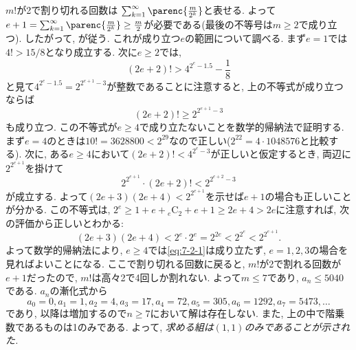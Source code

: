 $m!$が2で割り切れる回数は $\sum_{k=1}^{\infty} \parenc{\frac{m}{2^k}}$と表せる. よって$e + 1 = \sum_{k=1}^{\infty} \parenc{\frac{m}{2^k}} \geq \frac{m}{2}$が必要である(最後の不等号は$m\geq 2$で成り立つ). したがって,
が従う. これが成り立つ$e$の範囲について調べる. まず$e=1$では$4! > 15/8$となり成立する. 次に$e\geq 2$では,
\[
(2e+2)! > 4^{2^e - 1.5} - \frac{1}{8}
\]
と見て$4^{2^e - 1.5} = 2^{2^{e+1} - 3}$が整数であることに注意すると, 上の不等式が成り立つならば
\begin{equation} \label{eq:7-2-1}
    (2e+2)! \geq 2^{2^{e+1} - 3}
\end{equation}
も成り立つ. この不等式が$e\geq 4$で成り立たないことを数学的帰納法で証明する. まず$e=4$のときは$10! = 3628800 < 2^{29}$なので正しい($2^{22} = 4\cdot 1048576$と比較する). 次に, ある$e\geq 4$において$(2e + 2)! < 4^{2^e - 3}$が正しいと仮定するとき, 両辺に$2^{2^{e+1}}$を掛けて
\[
2^{2^{e+1}}\cdot (2e + 2)! < 2^{2^{e+2} - 3}
\]
が成立する. よって$(2e + 3)(2e + 4) < 2^{2^{e+1}}$を示せば$e+1$の場合も正しいことが分かる. この不等式は, $2^e \geq 1 + e + {}_{e}{\mathrm{C}}_{2} + e + 1 \geq 2e + 4 > 2e$に注意すれば, 次の評価から正しいとわかる:
\[
(2e + 3)(2e + 4) < 2^e\cdot 2^e = 2^{2e} < 2^{2^e} < 2^{2^{e+1}}.
\]
よって数学的帰納法により, $e\geq 4$では\cref{eq:7-2-1}は成り立たず, $e = 1,2,3$の場合を見ればよいことになる. ここで割り切れる回数に戻ると, $m!$が2で割れる回数が$e+1$だったので, $m!$は高々2で4回しか割れない. よって$m\leq 7$であり, $a_n \leq 5040$である. $a_n$の漸化式から
\[
a_0 = 0, a_1 = 1, a_2 = 4, a_3 = 17, a_4 = 72, a_5 = 305, a_6 = 1292, a_7 = 5473,\dots
\]
であり, 以降は増加するので$n\geq 7$において解は存在しない. また, 上の中で階乗数であるものは1のみである. よって, \emph{求める組は$(1,1)$のみであることが示された.}
